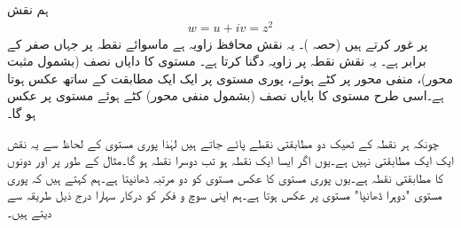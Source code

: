 ہم نقش 
\begin{align}
w=u+iv=z^2
\end{align}
پر غور کرتے ہیں (حصہ )۔ یہ نقش محافظ زاویہ ہے ماسوائے نقطہ  پر جہاں  صفر کے برابر ہے۔ یہ نقش نقطہ  پر  زاویہ دگنا کرتا ہے۔ مستوی کا دایاں نصف (بشمول مثبت  محور)، منفی  محور پر کٹے ہوئے،  پوری   مستوی پر ایک ایک مطابقت کے ساتھ عکس ہوتا ہے۔اسی طرح  مستوی کا بایاں نصف (بشمول منفی  محور) کٹے ہوئے  مستوی پر عکس ہو گا۔

چونکہ ہر  نقطہ کے ٹھیک دو مطابقتی  نقطے پائے جاتے ہیں لہٰذا  پوری  مستوی کے لحاظ سے یہ نقش ایک ایک مطابقتی نہیں ہے۔یوں اگر  ایسا ایک  نقطہ  ہو تب دوسرا نقطہ  ہو گا۔مثال کے طور پر  اور  دونوں کا مطابقتی نقطہ  ہے۔یوں پوری  مستوی کا عکس  مستوی کو دو مرتبہ ڈھانپتا ہے۔ہم کہتے ہیں کہ پوری  مستوی "دوہرا ڈھانپا"  مستوی پر عکس ہوتا ہے۔ہم اپنی سوچ و فکر کو درکار سہارا درج ذیل طریقہ سے دیتے ہیں۔

